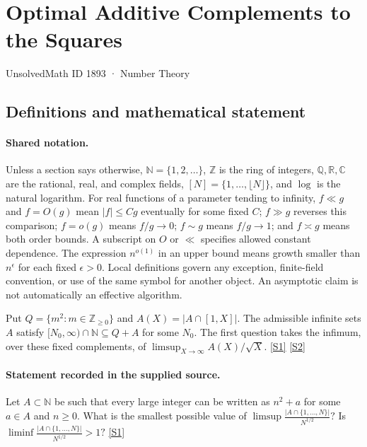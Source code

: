 \documentclass[11pt,a4paper]{article}
\newcommand{\N}{\mathbb{N}}
\newcommand{\Z}{\mathbb{Z}}
\newcommand{\Q}{\mathbb{Q}}
\newcommand{\R}{\mathbb{R}}
\newcommand{\C}{\mathbb{C}}
\newcommand{\sref}[2]{\hyperlink{source:#1:#2}{[S#2]}}
\begin{document}

\setcounter{section}{1892}

\section{Optimal Additive Complements to the Squares}\label{1893}

{\small\sffamily UnsolvedMath ID 1893 · Number Theory}

\subsection{Definitions and mathematical statement}

\paragraph{Shared notation.}Unless a section says otherwise, $\N=\{1,2,\ldots\}$,
$\Z$ is the ring of integers, $\Q,\R,\C$ are the rational, real, and complex
fields, $[N]=\{1,\ldots,\lfloor N\rfloor\}$, and $\log$ is the natural
logarithm. For real functions of a parameter tending to infinity,
$f\ll g$ and $f=O(g)$ mean $|f|\leq Cg$ eventually for some fixed $C$;
$f\gg g$ reverses this comparison; $f=o(g)$ means $f/g\to0$;
$f\sim g$ means $f/g\to1$; and $f\asymp g$ means both order bounds.
A subscript on $O$ or $\ll$ specifies allowed constant dependence.
The expression $n^{o(1)}$ in an upper bound means growth smaller than
$n^\epsilon$ for each fixed $\epsilon>0$. Local definitions govern any
exception, finite-field convention, or use of the same symbol for another
object. An asymptotic claim is not automatically an effective algorithm.



Put $Q=\{m^2:m\in\Z_{\geq0}\}$ and $A(X)=|A\cap[1,X]|$. The admissible infinite sets $A$ satisfy $[N_0,\infty)\cap\N\subseteq Q+A$ for some $N_0$. The first question takes the infimum, over these fixed complements, of $\limsup_{X\to\infty}A(X)/\sqrt X$. \sref{1893}{1} \sref{1893}{2}

\paragraph{Statement recorded in the supplied source.}
Let $A\subset\mathbb{N}$ be such that every large integer can be written as $n^2+a$ for some $a\in A$ and $n\geq 0$. What is the smallest possible value of $ \limsup \frac{\lvert A\cap\{1,\ldots,N\}\rvert}{N^{1/2}}? $ Is $ \liminf \frac{\lvert A\cap\{1,\ldots,N\}\rvert}{N^{1/2}}>1? $ \sref{1893}{1}
\end{document}
